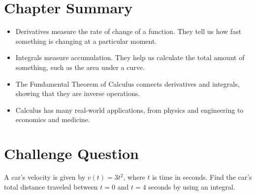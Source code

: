\section{Chapter Summary}
\begin{itemize}
    \item Derivatives measure the rate of change of a function. They tell us how fast something is changing at a particular moment.
    \item Integrals measure accumulation. They help us calculate the total amount of something, such as the area under a curve.
    \item The Fundamental Theorem of Calculus connects derivatives and integrals, showing that they are inverse operations.
    \item Calculus has many real-world applications, from physics and engineering to economics and medicine.
\end{itemize}

\section{Challenge Question}
A car’s velocity is given by \( v(t) = 3t^2 \), where \( t \) is time in seconds. Find the car’s total distance traveled between \( t = 0 \) and \( t = 4 \) seconds by using an integral.